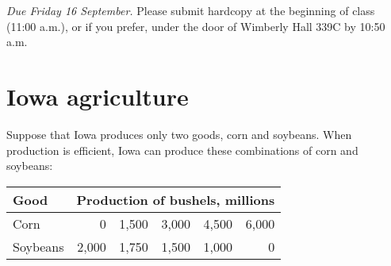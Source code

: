 \documentclass{assignment}
\date{Wednesday 14 September 2022}
\begin{document}
\RaggedRight

\beginassignment{}

\emph{Due Friday 16 September.} Please submit hardcopy at the beginning of class (11:00 a.m.), or if you prefer, under the door of Wimberly Hall 339C by 10:50 a.m.

\section*{Iowa agriculture}

Suppose that Iowa produces only two goods, corn and soybeans. When production is efficient, Iowa can produce these combinations of corn and soybeans:

{\footnotesize\begin{tabular}{lrrrrr}
\toprule
Good & \multicolumn{5}{c}{Production of bushels, millions} \\
\midrule
Corn     & 0 & 1,500 & 3,000 & 4,500 & 6,000 \\
Soybeans & 2,000 & 1,750 & 1,500 & 1,000 & 0 \\
\bottomrule
\end{tabular}}
\end{document}
